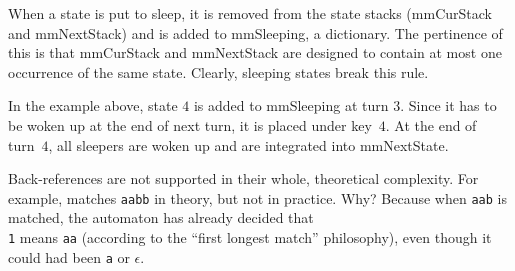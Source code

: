 When a state is put to sleep, it is removed from the state stacks ({\sf mmCurStack} and {\sf mmNextStack}) and is added to {\sf mmSleeping}, a dictionary.  The pertinence of this is that {\sf mmCurStack} and {\sf mmNextStack} are designed to contain at most one occurrence of the same state.  Clearly, sleeping states break this rule.

In the example above, state $4$ is added to {\sf mmSleeping} at turn $3$.  Since it has to be woken up at the end of next turn, it is placed under key~$4$.  At the end of turn~$4$, all sleepers are woken up and are integrated into {\sf mmNextState}.

Back-references are not supported in their whole, theoretical complexity.  For example,  matches {\tt aabb} in theory, but not in practice.  Why?  Because when {\tt aab} is matched, the automaton has already decided that {\tt \\1} means {\tt aa} (according to the ``first longest match'' philosophy), even though it could had been {\tt a} or $\epsilon$.

\bye
